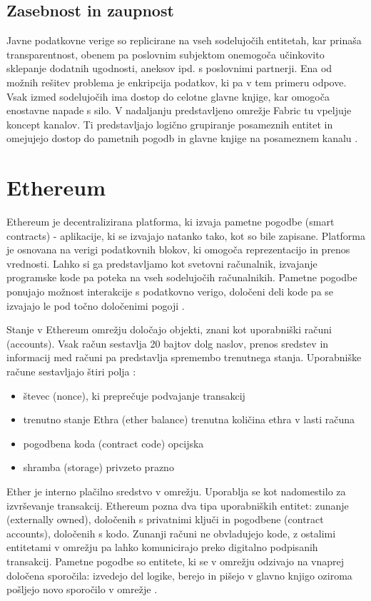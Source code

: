 \documentclass[a4paper, 12pt]{book}
\begin{document}
\subsection{Zasebnost in zaupnost}
Javne podatkovne verige so replicirane na vseh sodelujočih entitetah, kar prinaša transparentnost, obenem pa poslovnim subjektom onemogoča učinkovito sklepanje dodatnih ugodnosti, aneksov ipd. s poslovnimi partnerji.
Ena od možnih rešitev problema je enkripcija podatkov, ki pa v tem primeru odpove.
Vsak izmed sodelujočih ima dostop do celotne glavne knjige, kar omogoča enostavne napade s silo.
V nadaljanju predstavljeno omrežje Fabric tu vpeljuje koncept kanalov.
Ti predstavljajo logično grupiranje posameznih entitet in omejujejo dostop do pametnih pogodb in glavne knjige na posameznem kanalu \cite{hyperledgerDocs}.

\section{Ethereum}
Ethereum je decentralizirana platforma, ki izvaja pametne pogodbe (smart contracts) - aplikacije, ki se izvajajo natanko tako, kot so bile zapisane.
Platforma je osnovana na verigi podatkovnih blokov, ki omogoča reprezentacijo in prenos vrednosti.
Lahko si ga predstavljamo kot svetovni računalnik, izvajanje programske kode pa poteka na vseh sodelujočih računalnikih.
Pametne pogodbe ponujajo možnost interakcije s podatkovno verigo, določeni deli kode pa se izvajajo le pod točno določenimi pogoji \cite{ethereumWhitepaper}.

Stanje v Ethereum omrežju določajo objekti, znani kot uporabniški računi (accounts).
Vsak račun sestavlja 20 bajtov dolg naslov, prenos sredstev in informacij med računi pa predstavlja spremembo trenutnega stanja.
Uporabniške račune sestavljajo štiri polja \cite{ethereumWhitepaper}:
\begin{itemize}
\item števec (nonce), ki preprečuje podvajanje transakcij
\item trenutno stanje Ethra (ether balance) trenutna količina ethra v lasti računa
\item pogodbena koda (contract code) opcijska
\item shramba (storage) privzeto prazno
\end{itemize}

Ether je interno plačilno sredstvo v omrežju.
Uporablja se kot nadomestilo za izvrševanje transakcij.
Ethereum pozna dva tipa uporabniških entitet: zunanje (externally owned), določenih s privatnimi ključi in pogodbene (contract accounts), določenih s kodo.
Zunanji računi ne obvladujejo kode, z ostalimi entitetami v omrežju pa lahko komunicirajo preko digitalno podpisanih transakcij.
Pametne pogodbe so entitete, ki se v omrežju odzivajo na vnaprej določena sporočila: izvedejo del logike, berejo in pišejo v glavno knjigo oziroma pošljejo novo sporočilo v omrežje \cite{ethereumWhitepaper}.
\end{document}
